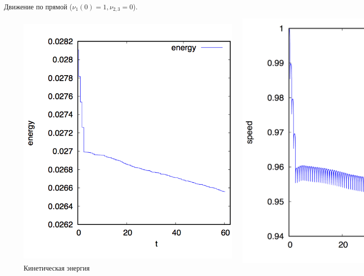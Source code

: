 \begin{frame}{Движение по прямой ($\nu_1(0) = 1, \nu_{2,3} = 0$).}
    \begin{figure}[H]
        \centering
        \begin{columns}
                \centering
                \includegraphics[width=1.1\linewidth]{content/pic/straight_60/kin_en.png}
                \vspace{-15pt}
                \caption{Кинетическая энергия}
                \centering
                \includegraphics[width=0.8\linewidth]{content/pic/straight_60/v.png}

\end{columns}
\end{figure}
\end{frame}
